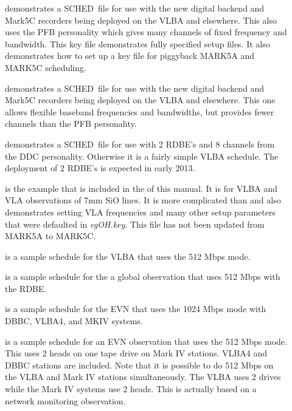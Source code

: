 \documentclass{report}
\newcommand{\schedb}{{\sc SCHED~}}
\begin{document}
\begin{description}
\item[]
demonstrates a \schedb file for use with the new digital backend and
Mark5C recorders being deployed on the VLBA and elsewhere.  This also
uses the PFB personality which gives many channels of fixed frequency
and bandwidth.  This key file demonstrates fully specified setup
files.  It also demonstrates how to set up a key file for piggyback
MARK5A and MARK5C scheduling.

\item[]
demonstrates a \schedb file for use with the new digital backend
and Mark5C recorders being deployed on the VLBA and elsewhere.
This one allows flexible baseband frequencies and bandwidths, but provides
fewer channels than the PFB personality.

\item[]
demonstrates a \schedb file for use with 2 RDBE's and 8 channels
from the DDC personality.  Otherwise it is a fairly simple VLBA
schedule.  The deployment of 2 RDBE's is expected in early 2013.

\item[] is the example that is
included in the  of this
manual.  It is for VLBA and VLA observations of 7mm SiO lines.  It
is more complicated than  and also demonstrates setting VLA
frequencies and many other setup parameters that were defaulted
in {\sl egOH.key}.  This file has not been updated from MARK5A to 
MARK5C.

\item[] is a
sample schedule for the VLBA that uses the 512 Mbps mode.

\item[] is a
sample schedule for the a global observation that uses 512 Mbps with
the RDBE.

\item[] is a
sample schedule for the EVN that uses the 1024 Mbps mode with DBBC,
VLBA4, and MKIV systems.

\item[] is
a sample schedule for an EVN observation that uses the 512 Mbps mode.
This uses 2 heads on one tape drive on Mark IV stations.  VLBA4 and
DBBC stations are included.  Note that it is possible to do 512 Mbps
on the VLBA and Mark IV stations simultaneously.  The VLBA uses 2
drives while the Mark IV systems use 2 heads.  This is actually based
on a network monitoring observation.


\end{description}
\end{document}
